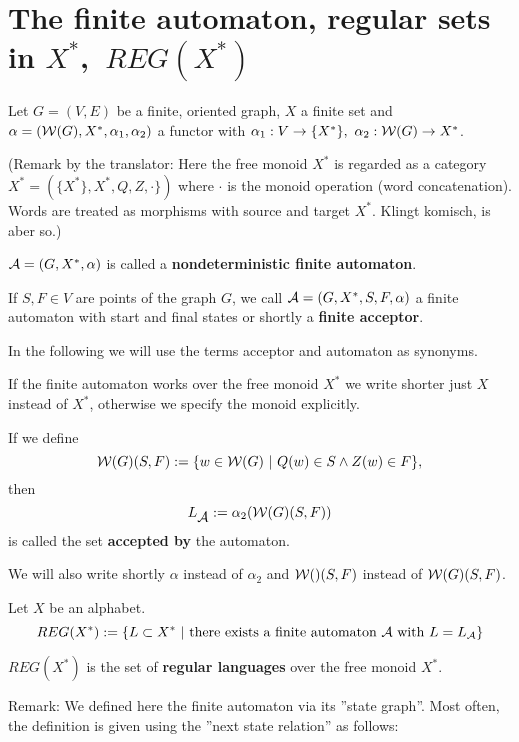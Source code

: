 \section{The finite automaton, regular sets in $X^*$,\ $REG(X^*)$}

Let $G = (V, E)$ be a finite, oriented graph, $X$ a finite set and $\alpha =
(\mbox{$\mathcal{W}(G)$}, X^*,\alpha_1, \alpha_2)$ a functor with $\alpha_1 : V \to \{ X^*
\},\ \alpha_2 : \mbox{$\mathcal{W}(G)$} \to X^*$.

(Remark by the translator: Here the free monoid $X^*$ is regarded as a category
$X^* = (\{X^*\}, X^*, Q, Z, \cdot \})$ where $\cdot$ is the monoid operation
(word concatenation). Words are treated as morphisms with source and target
$X^*$. Klingt komisch, is aber so.)

\begin{definition}
$\mbox{$\mathcal{A}$} = (G, X^*, \alpha)$ is called a {\bf nondeterministic finite
automaton}.
\end{definition}

If $S, F \in V$ are points of the graph $G$, we call $\mbox{$\mathcal{A}$} = (G, X^*,
S, F, \alpha)$ a finite automaton with start and final states or shortly a {\bf
finite acceptor}.

In the following we will use the terms acceptor and automaton as synonyms.

If the finite automaton works over the free monoid $X^*$ we write shorter just
$X$ instead of $X^*$, otherwise we specify the monoid explicitly.

\begin{definition}
If we define 
\[ \mbox{$\mathcal{W}(G)$}(S, F) := \{ w \in \mbox{$\mathcal{W}(G)$}\ |\ Q(w) \in S \wedge Z(w)
\in F \}, \]
then \[ L_{\mbox{$\mathcal{A}$}} := \alpha_2(\mbox{$\mathcal{W}(G)$}(S, F)) \] 
is called the set {\bf accepted by} the automaton. 
\end{definition}

We will also write shortly $\alpha$ instead of $\alpha_2$ and $\mbox{$\mathcal{W}()$}(S,F)$
instead of $\mbox{$\mathcal{W}(G)$}(S,F)$.

\begin{definition}
Let $X$ be an alphabet. \[ REG(X^*) := \{ L \subset X^*\ | \mbox{ there
exists a finite automaton } \mbox{$\mathcal{A}$} \mbox{ with } L = \mbox{$L_{\mathcal{A}}$} \}
\]

$REG(X^*)$ is the set of {\bf regular languages} over the free monoid $X^*$.
\end{definition}

Remark: We defined here the finite automaton via its ''state graph''. Most
often, the definition is given using the ''next state relation'' as follows:

